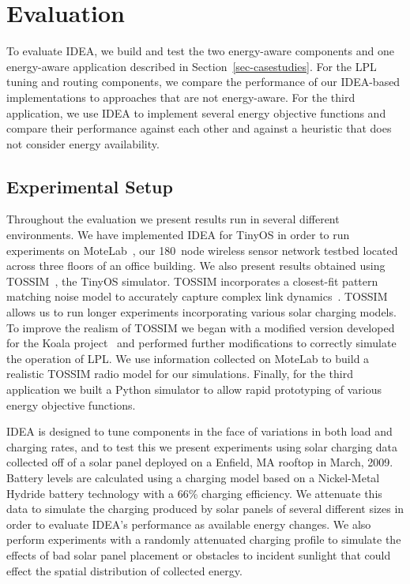 \section{Evaluation}
\label{sec-evaluation}

To evaluate IDEA, we build and test the two energy-aware components and
one energy-aware application described in Section~\ref{sec-casestudies}. For
the LPL tuning and routing components, we compare the performance of our
IDEA-based implementations to approaches that are not energy-aware.
For the third application, we use IDEA to implement several energy objective
functions and compare their performance against each other and against a
heuristic that does not consider energy availability.

\subsection{Experimental Setup}
\label{subsec-experimentalsetup}

Throughout the evaluation we present results run in several different
environments. We have implemented IDEA for TinyOS in order to run experiments
on MoteLab~\cite{motelab}, our 180~node wireless sensor network testbed
located across three floors of an office building. We also present results
obtained using TOSSIM~\cite{tossim}, the TinyOS simulator.  TOSSIM
incorporates a closest-fit pattern matching noise model to accurately capture
complex link dynamics~\cite{cpm-ipsn07}. TOSSIM allows us to run longer
experiments incorporating various solar charging models. To improve the
realism of TOSSIM we began with a modified version developed for the Koala
project~\cite{koala-ipsn08} and performed further modifications to correctly
simulate the operation of LPL. We use information collected on MoteLab to
build a realistic TOSSIM radio model for our simulations.  Finally, for the
third application we built a Python simulator to allow rapid prototyping of
various energy objective functions.

IDEA is designed to tune components in the face of variations in both load
and charging rates, and to test this we present experiments using solar
charging data collected off of a solar panel deployed on a Enfield, MA
rooftop in March, 2009. Battery levels are calculated using a charging model
based on a Nickel-Metal Hydride battery technology with a 66\% charging
efficiency. We attenuate this data to simulate the charging produced by solar
panels of several different sizes in order to evaluate IDEA's performance as
available energy changes. We also perform experiments with a randomly
attenuated charging profile to simulate the effects of bad solar panel
placement or obstacles to incident sunlight that could effect the spatial
distribution of collected energy.

